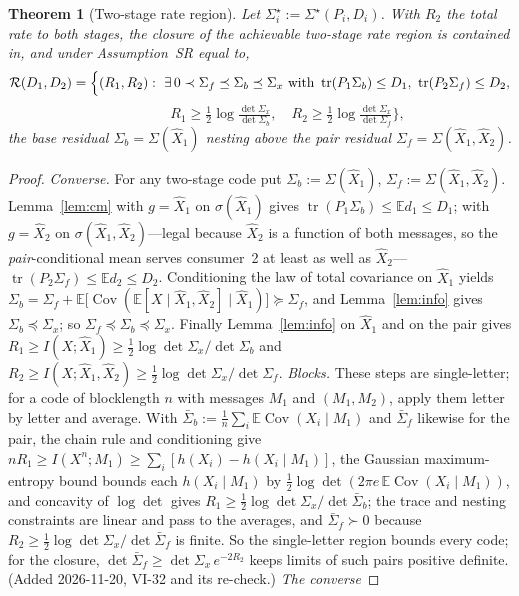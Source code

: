 \documentclass[11pt]{article}
\newtheorem{theorem}{Theorem}
\theoremstyle{definition}
\theoremstyle{remark}
\newcommand{\tr}{\operatorname{tr}}
\newcommand{\E}{\mathbb{E}}
\newcommand{\Cov}{\operatorname{Cov}}
\begin{document}
\begin{theorem}[Two-stage rate region]\label{thm:region}
Let $\Sigma_i^\star:=\Sigma^\star(P_i,D_i)$. With $R_2$ the total rate to both stages, the
closure of the achievable two-stage rate region is contained in, and under
Assumption~SR equal to,
\[
\mathcal R(D_1,D_2)=\Bigl\{(R_1,R_2):\ \exists\,0\prec\Sigma_f\preceq\Sigma_b\preceq\Sigma_x
\text{ with }\tr(P_1\Sigma_b)\le D_1,\ \tr(P_2\Sigma_f)\le D_2,
\]
\[
\qquad\qquad R_1\ge\tfrac12\log\tfrac{\det\Sigma_x}{\det\Sigma_b},\quad
R_2\ge\tfrac12\log\tfrac{\det\Sigma_x}{\det\Sigma_f}\Bigr\},
\]
the base residual $\Sigma_b=\Sigma(\hat X_1)$ nesting above the pair residual
$\Sigma_f=\Sigma(\hat X_1,\hat X_2)$.
\end{theorem}
\begin{proof}
\emph{Converse.} For any two-stage code put $\Sigma_b:=\Sigma(\hat X_1)$,
$\Sigma_f:=\Sigma(\hat X_1,\hat X_2)$. Lemma~\ref{lem:cm} with $g=\hat X_1$ on
$\sigma(\hat X_1)$ gives $\tr(P_1\Sigma_b)\le\E d_1\le D_1$; with $g=\hat X_2$ on
$\sigma(\hat X_1,\hat X_2)$---legal because $\hat X_2$ is a function of both messages, so
the \emph{pair}-conditional mean serves consumer~2 at least as well as $\hat
X_2$---$\tr(P_2\Sigma_f)\le\E d_2\le D_2$. Conditioning the law of total covariance on
$\hat X_1$ yields $\Sigma_b=\Sigma_f+\E\bigl[\Cov(\E[X\mid\hat X_1,\hat X_2]\mid\hat
X_1)\bigr]\succeq\Sigma_f$, and Lemma~\ref{lem:info} gives $\Sigma_b\preceq\Sigma_x$; so
$\Sigma_f\preceq\Sigma_b\preceq\Sigma_x$. Finally Lemma~\ref{lem:info} on $\hat X_1$ and
on the pair gives $R_1\ge I(X;\hat X_1)\ge\tfrac12\log\det\Sigma_x/\det\Sigma_b$ and
$R_2\ge I(X;\hat X_1,\hat X_2)\ge\tfrac12\log\det\Sigma_x/\det\Sigma_f$. \emph{Blocks.}
These steps are single-letter; for a code of blocklength $n$ with messages $M_1$ and
$(M_1,M_2)$, apply them letter by letter and average. With
$\bar\Sigma_b:=\tfrac1n\sum_i\E\Cov(X_i\mid M_1)$ and $\bar\Sigma_f$ likewise for the
pair, the chain rule and conditioning give $nR_1\ge I(X^n;M_1)\ge\sum_i[h(X_i)-h(X_i\mid
M_1)]$, the Gaussian maximum-entropy bound bounds each $h(X_i\mid M_1)$ by
$\tfrac12\log\det(2\pi e\,\E\Cov(X_i\mid M_1))$, and concavity of $\log\det$ gives
$R_1\ge\tfrac12\log\det\Sigma_x/\det\bar\Sigma_b$; the trace and nesting constraints are
linear and pass to the averages, and $\bar\Sigma_f\succ0$ because $R_2\ge\tfrac12\log\det
\Sigma_x/\det\bar\Sigma_f$ is finite. So the single-letter region bounds every code; for the
closure, $\det\bar\Sigma_f\ge\det\Sigma_x\,e^{-2R_2}$ keeps limits of such pairs positive
definite. (Added 2026-11-20, VI-32 and its re-check.) \emph{The converse
}
\end{proof}
\end{document}
